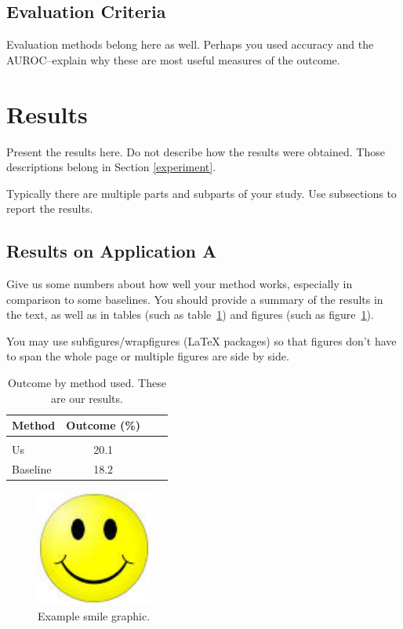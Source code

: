 \documentclass[twoside,11pt]{article}
\begin{document}
\subsection{Evaluation Criteria}
Evaluation methods belong here as well.
Perhaps you used accuracy and the AUROC--explain why these are most useful measures of the outcome.

\section{Results} \label{results}

Present the results here.
Do not describe how the results were obtained.
Those descriptions belong in Section \ref{experiment}.

Typically there are multiple parts and subparts of your study.
Use subsections to report the results.

\subsection{Results on Application A} 

Give us some numbers about how well your method works, especially in comparison to some baselines.
You should provide a summary of the results in the text, as well as in tables (such as table~\ref{tab:example}) and figures (such as figure~\ref{fig:example}).  

You may use subfigures/wrapfigures (LaTeX packages) so that figures don't have to span the whole page or multiple figures are side by side.

\begin{table}[htbp]
  \centering 
  \begin{tabular}{lclc} 
    Method & Outcome (\%) \\ 
    \hline \\[-11pt]
    Us & 20.1 \\ 
    Baseline & 18.2 \\ \hline 
  \end{tabular}
  \label{tab:example} 
    \caption{Outcome by method used. These are our results.} 
\end{table}

\begin{figure}[htbp]
  \centering 
  \includegraphics[width=1.5in]{smile.jpeg} 
  \caption{Example smile graphic.}
  \label{fig:example} 
\end{figure} 
\end{document}
